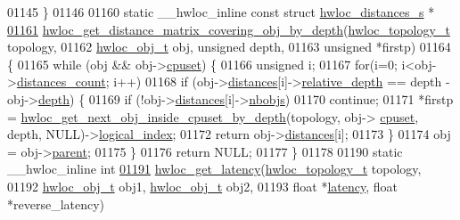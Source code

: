 \begin{DoxyCode}
01145 \}
01146 
01160 \textcolor{keyword}{static} \_\_hwloc\_inline \textcolor{keyword}{const} \textcolor{keyword}{struct }\hyperlink{a00014}{hwloc_distances_s} *
\hypertarget{a00031_source_l01161}{}\hyperlink{a00063_ga186ac2711b98a12cf46d58cd005fbb51}{01161} \hyperlink{a00063_ga186ac2711b98a12cf46d58cd005fbb51}{hwloc_get_distance_matrix_covering_obj_by_depth}(\hyperlink{a00039_ga9d1e76ee15a7dee158b786c30b6a6e38}{hwloc_topology_t} topology,
01162                                                 \hyperlink{a00016}{hwloc_obj_t} obj, \textcolor{keywordtype}{unsigned} depth,
01163                                                 \textcolor{keywordtype}{unsigned} *firstp)
01164 \{
01165   \textcolor{keywordflow}{while} (obj && obj->\hyperlink{a00016_a67925e0f2c47f50408fbdb9bddd0790f}{cpuset}) \{
01166     \textcolor{keywordtype}{unsigned} i;
01167     \textcolor{keywordflow}{for}(i=0; i<obj->\hyperlink{a00016_a8be6f63eca4da91000c832280db927b7}{distances_count}; i++)
01168       \textcolor{keywordflow}{if} (obj->\hyperlink{a00016_a9a5dd75596edc48fe834f81988cdc0d6}{distances}[i]->\hyperlink{a00014_a6fe066eaf62ee448aa05bab8e7217ff7}{relative_depth} == depth - obj->\hyperlink{a00016_a9d82690370275d42d652eccdea5d3ee5}{depth}) \{
01169         \textcolor{keywordflow}{if} (!obj->\hyperlink{a00016_a9a5dd75596edc48fe834f81988cdc0d6}{distances}[i]->\hyperlink{a00014_a4ca2af858cebbce7324ec49903d09474}{nbobjs})
01170           \textcolor{keywordflow}{continue};
01171         *firstp = \hyperlink{a00054_ga8af256c2572f16520f95440b884c1bd6}{hwloc_get_next_obj_inside_cpuset_by_depth}(topology, obj->
      \hyperlink{a00016_a67925e0f2c47f50408fbdb9bddd0790f}{cpuset}, depth, NULL)->\hyperlink{a00016_a0d07fb7b8935e137c94d75a3eb492ae9}{logical_index};
01172         \textcolor{keywordflow}{return} obj->\hyperlink{a00016_a9a5dd75596edc48fe834f81988cdc0d6}{distances}[i];
01173       \}
01174     obj = obj->\hyperlink{a00016_adc494f6aed939992be1c55cca5822900}{parent};
01175   \}
01176   \textcolor{keywordflow}{return} NULL;
01177 \}
01178 
01190 \textcolor{keyword}{static} \_\_hwloc\_inline \textcolor{keywordtype}{int}
\hypertarget{a00031_source_l01191}{}\hyperlink{a00063_ga9addde99e34b815df47625f1d6191839}{01191} \hyperlink{a00063_ga9addde99e34b815df47625f1d6191839}{hwloc_get_latency}(\hyperlink{a00039_ga9d1e76ee15a7dee158b786c30b6a6e38}{hwloc_topology_t} topology,
01192                    \hyperlink{a00016}{hwloc_obj_t} obj1, \hyperlink{a00016}{hwloc_obj_t} obj2,
01193                    \textcolor{keywordtype}{float} *\hyperlink{a00014_a0f70f48d1bfb18e5e2008825da2967c9}{latency}, \textcolor{keywordtype}{float} *reverse\_latency)

\end{DoxyCode}
